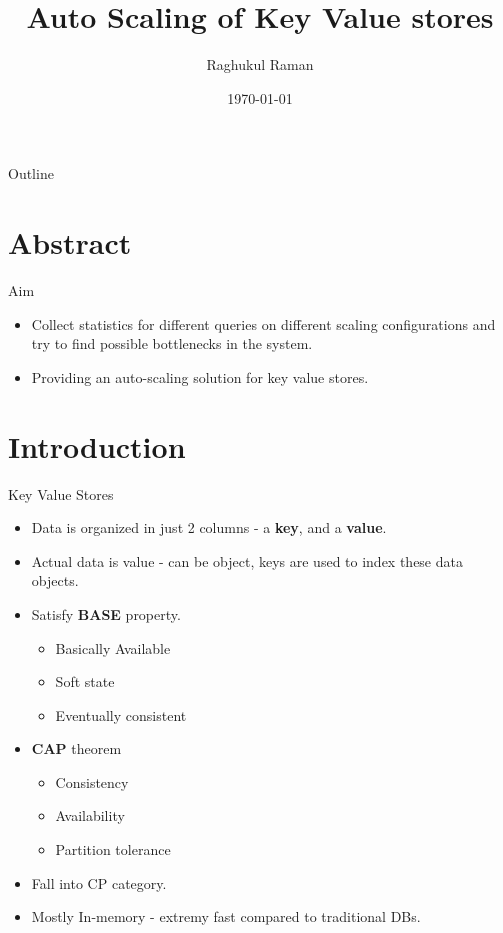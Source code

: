 \documentclass{beamer}
\title[CS396]{Auto Scaling of Key Value stores}
\author{Raghukul Raman}
\institute{IIT Kanpur}
\date{\today}
\begin{document}
\begin{frame}
  \titlepage
\end{frame}

\begin{frame}{Outline}
  \tableofcontents
\end{frame}

\section{Abstract}

\begin{frame}{Aim}
    \begin{itemize}
        \item Collect statistics for different queries on different scaling configurations
            and try to find possible bottlenecks in the system.
        \item Providing an auto-scaling solution for key
                value stores. 
    \end{itemize}
\end{frame}



\section{Introduction}
\begin{frame}{Key Value Stores}
    \begin{itemize}
        \item Data is organized in just 2 columns - a \textbf{key}, and a \textbf{value}.
        \item Actual data is value - can be object, keys are used to index these data objects.
        \item Satisfy \textbf{BASE} property.
            \begin{itemize}
                \item Basically Available
                \item Soft state
                \item Eventually consistent
            \end{itemize}
        \item \textbf{CAP} theorem
            \begin{itemize}
                \item Consistency
                \item Availability
                \item Partition tolerance
            \end{itemize}
        \item Fall into CP category.
        \item Mostly In-memory - extremy fast compared to traditional DBs.
    \end{itemize}
\end{frame}
\end{document}
